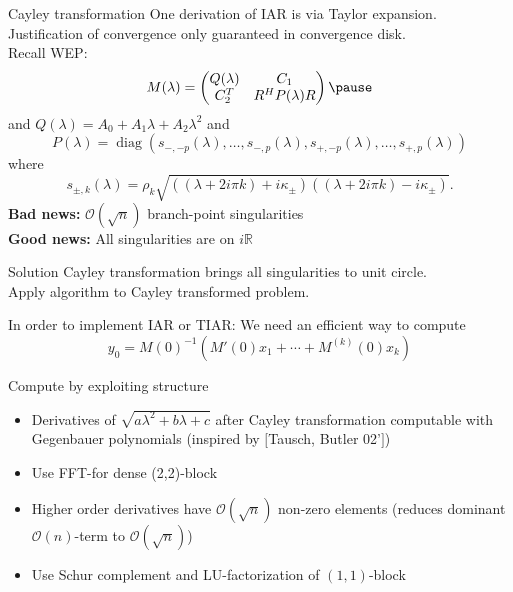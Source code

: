 \documentclass[10pt]{beamer}
\newcommand{\RR}{\mathbb{R}}
\newcommand{\diag}{\operatorname{diag}}
\newcommand{\mycite}[1]{$[$#1$]$}
\begin{document}
\begin{frame}{Cayley transformation}
One derivation of IAR is via Taylor expansion. %
Justification of convergence only guaranteed in convergence
disk. ~\\
Recall WEP: \[
  M(\lambda)=
  \begin{pmatrix}
    Q(\lambda) & C_1\\
    C_2^T & R^HP(\lambda)R
  \end{pmatrix}\pause
\]
and $Q(\lambda)=A_0+A_1\lambda+A_2\lambda^2$ and %
\[
  P(\lambda)=
\diag(s_{-,-p}(\lambda),\ldots,s_{-,p}(\lambda),
s_{+,-p}(\lambda),\ldots,s_{+,p}(\lambda))
\]
where 
\[
s_{\pm,k}(\lambda)=\rho_k \sqrt{((\lambda+2i\pi k)+i\kappa_\pm)((\lambda+2i\pi k)-i\kappa_\pm)}.
\]\pause
{\bf Bad news:} $\mathcal{O}(\sqrt{n})$ branch-point  singularities~\\
{\bf Good news:} All singularities are on $i\RR$~\\\pause
\begin{block}{Solution}
Cayley transformation brings all singularities to unit circle. ~\\
Apply algorithm to Cayley transformed problem.
\end{block}
\end{frame}

\begin{frame}
In order to implement IAR or TIAR: We need an efficient way to compute
\[
y_0=M(0)^{-1}(M'(0)x_1+\cdots+M^{(k)}(0)x_k)
\]\pause
\begin{block}{Compute by exploiting structure}
\begin{itemize}
  \item Derivatives of $\sqrt{a\lambda^2+b\lambda+c}$ after Cayley transformation computable with Gegenbauer polynomials (inspired by \mycite{Tausch, Butler 02'})
  \item Use FFT-for dense (2,2)-block
  \item Higher order derivatives have $\mathcal{O}(\sqrt{n})$ non-zero
elements (reduces dominant $\mathcal{O}(n)$-term to $\mathcal{O}(\sqrt{n})$)
  \item Use Schur complement and LU-factorization of $(1,1)$-block
\end{itemize}
\end{block}
\end{frame}
\end{document}
